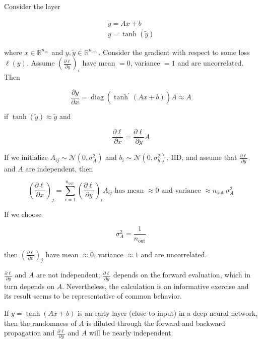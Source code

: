 \begin{definition}
    Consider the layer

    $$
    \begin{gathered}
    \tilde{y}=A x+b \\
    y=\tanh (\tilde{y})
    \end{gathered}
    $$

    where $x \in \mathbb{R}^{n_{\text {in }}}$ and $y, \tilde{y} \in \mathbb{R}^{n_{\text {out }}}$. Consider the gradient with respect to some loss $\ell(y)$. Assume $\left(\frac{\partial \ell}{\partial y}\right)_{i}$ have mean $=0$, variance $=1$ and are uncorrelated. Then

    $$
    \frac{\partial y}{\partial x}=\operatorname{diag}\left(\tanh ^{\prime}(A x+b)\right) A \approx A
    $$

    if $\tanh (\tilde{y}) \approx \tilde{y}$ and

    $$
    \frac{\partial \ell}{\partial x}=\frac{\partial \ell}{\partial y} A
    $$

    If we initialize $A_{i j} \sim \mathcal{N}\left(0, \sigma_{A}^{2}\right)$ and $b_{i} \sim \mathcal{N}\left(0, \sigma_{b}^{2}\right)$, IID, and assume that $\frac{\partial \ell}{\partial y}$ and $A$ are independent, then

    $$
    \left(\frac{\partial \ell}{\partial x}\right)_{j}=\sum_{i=1}^{n_{\text {out }}}\left(\frac{\partial \ell}{\partial y}\right)_{i} A_{i j} \text { has mean } \approx 0 \text { and variance } \approx n_{\text {out }} \sigma_{A}^{2}
    $$

    If we choose

    $$
    \sigma_{A}^{2}=\frac{1}{n_{\mathrm{out}}}
    $$

    then $\left(\frac{\partial \ell}{\partial x}\right)_{j}$ have mean $\approx 0$, variance $\approx 1$ and are uncorrelated.

    \par\noindent\textcolor{gray}{\hdashrule{\textwidth}{0.4pt}{1pt 2pt}}

    $\frac{\partial \ell}{\partial y}$ and $A$ are not independent; $\frac{\partial \ell}{\partial y}$ depends on the forward evaluation, which in turn depends on $A$. Nevertheless, the calculation is an informative exercise and its result seems to be representative of common behavior.

    If $y=\tanh (A x+b)$ is an early layer (close to input) in a deep neural network, then the randomness of $A$ is diluted through the forward and backward propagation and $\frac{\partial \ell}{\partial y}$ and $A$ will be nearly independent.


\end{definition}
